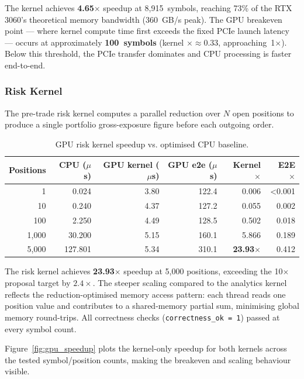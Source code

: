 \documentclass[12pt]{article}
\begin{document}
The kernel achieves \textbf{4.65$\times$} speedup at 8,915~symbols,
reaching 73\% of the RTX 3060's theoretical memory bandwidth
(360~GB/s peak). The GPU breakeven point — where kernel compute time
first exceeds the fixed PCIe launch latency — occurs at approximately
\textbf{100~symbols} (kernel $\times \approx 0.33$, approaching~1$\times$).
Below this threshold, the PCIe transfer dominates and CPU processing is
faster end-to-end.

\subsubsection*{Risk Kernel}

The pre-trade risk kernel computes a parallel reduction over $N$ open
positions to produce a single portfolio gross-exposure figure before
each outgoing order.

\begin{table}[H]
\centering
\small
\caption{GPU risk kernel speedup vs. optimised CPU baseline.}
\label{tab:gpu_risk}
\begin{tabular}{@{}rrrrrr@{}}
\toprule
\textbf{Positions} & \textbf{CPU ($\mu$s)} & \textbf{GPU kernel ($\mu$s)} & \textbf{GPU e2e ($\mu$s)} & \textbf{Kernel $\times$} & \textbf{E2E $\times$} \\
\midrule
      1 &    0.024 &  3.80 & 122.4 & 0.006 & \textless0.001 \\
     10 &    0.240 &  4.37 & 127.2 & 0.055 & 0.002 \\
    100 &    2.250 &  4.49 & 128.5 & 0.502 & 0.018 \\
  1{,}000 &   30.200 &  5.15 & 160.1 & 5.866 & 0.189 \\
  5{,}000 &  127.801 &  5.34 & 310.1 & \textbf{23.93}$\times$ & 0.412 \\
\bottomrule
\end{tabular}
\end{table}

The risk kernel achieves \textbf{23.93$\times$} speedup at 5,000
positions, exceeding the 10$\times$ proposal target by $2.4\times$.
The steeper scaling compared to the analytics kernel reflects the
reduction-optimised memory access pattern: each thread reads one
position value and contributes to a shared-memory partial sum,
minimising global memory round-trips. All correctness checks
(\texttt{correctness\_ok = 1}) passed at every symbol count.

Figure~\ref{fig:gpu_speedup} plots the kernel-only speedup for both
kernels across the tested symbol/position counts, making the breakeven
and scaling behaviour visible.
\end{document}
